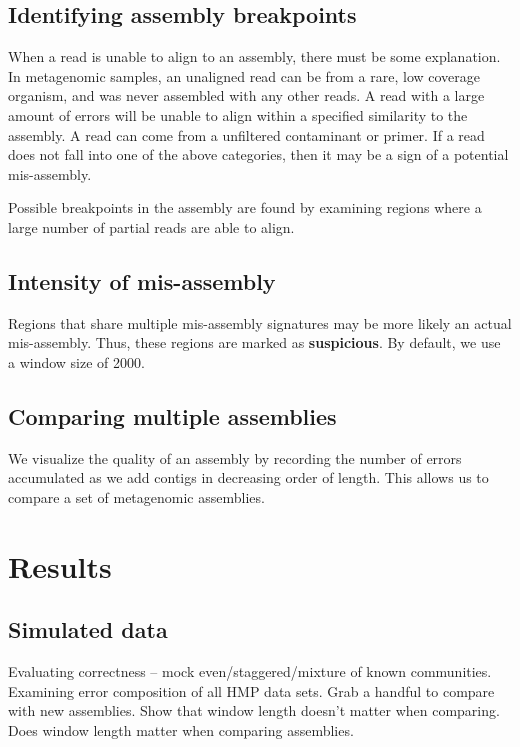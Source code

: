 \subsection{Identifying assembly breakpoints}
When a read is unable to align to an assembly, there must be some explanation.
In metagenomic samples, an unaligned read can be from a rare, low coverage organism, and was never assembled with any other reads. A read with a large amount of errors will be unable to align within a specified similarity to the assembly.
A read can come from a unfiltered contaminant or primer.
If a read does not fall into one of the above categories, then it may be a sign of a potential mis-assembly.

Possible breakpoints in the assembly are found by examining regions where a large number of partial reads are able to align.
\subsection{Intensity of mis-assembly}
Regions that share multiple mis-assembly signatures may be more likely an actual mis-assembly.
Thus, these regions are marked as \textbf{suspicious}.
By default, we use a window size of 2000.

\subsection{Comparing multiple assemblies}

We visualize the quality of an assembly by recording the number of errors accumulated as we add contigs in decreasing order of length.
This allows us to compare a set of metagenomic assemblies.


\section{Results}

\subsection{Simulated data}
Evaluating correctness – mock even/staggered/mixture of known communities.
Examining error composition of all HMP data sets.
Grab a handful to compare with new assemblies.
Show that window length doesn’t matter when comparing.
Does window length matter when comparing assemblies.


